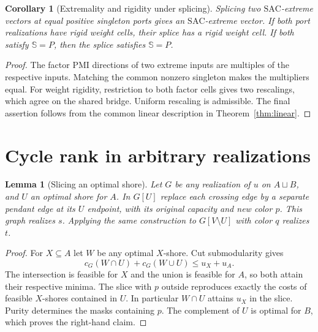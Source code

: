 \documentclass[11pt]{article}
\newtheorem{lemma}[theorem]{Lemma}
\newtheorem{corollary}[theorem]{Corollary}
\newcommand{\SAC}{\mathrm{SAC}}
\newcommand{\MC}{\mathbb{S}}
\begin{document}
\begin{corollary}[Extremality and rigidity under splicing]
\label{cor:rigid}
Splicing two \(\SAC\)-extreme vectors at equal positive singleton ports
gives an \(\SAC\)-extreme vector. If both port realizations have rigid
weight cells, their splice has a rigid weight cell. If both satisfy
\(\MC=P\), then the splice satisfies \(\MC=P\).
\end{corollary}

\begin{proof}
The factor PMI directions of two extreme inputs are multiples of the
respective inputs. Matching the common nonzero singleton makes the
multipliers equal. For weight rigidity, restriction to both factor
cells gives two rescalings, which agree on the shared bridge. Uniform
rescaling is admissible. The final assertion follows from the common
linear description in Theorem~\ref{thm:linear}.
\end{proof}

\section{Cycle rank in arbitrary realizations}
\label{sec:slicing}

\begin{lemma}[Slicing an optimal shore]
\label{lem:slice}
Let \(G\) be any realization of \(u\) on \(A\sqcup B\), and \(U\) an
optimal shore for \(A\). In \(G[U]\) replace each crossing edge by a
separate pendant edge at its \(U\) endpoint, with its original capacity
and new color \(p\). This graph realizes \(s\). Applying the same
construction to \(G[V\setminus U]\) with color \(q\) realizes \(t\).
\end{lemma}

\begin{proof}
For \(X\subseteq A\) let \(W\) be any optimal \(X\)-shore. Cut
submodularity gives
\[
 c_G(W\cap U)+c_G(W\cup U)\leq u_X+u_A.
\]
The intersection is feasible for \(X\) and the union is feasible for
\(A\), so both attain their respective minima. The slice with \(p\)
outside reproduces exactly the costs of feasible \(X\)-shores contained
in \(U\). In particular \(W\cap U\) attains \(u_X\) in the slice.
Purity determines the masks containing \(p\). The complement of \(U\)
is optimal for \(B\), which proves the right-hand claim.
\end{proof}
\end{document}
